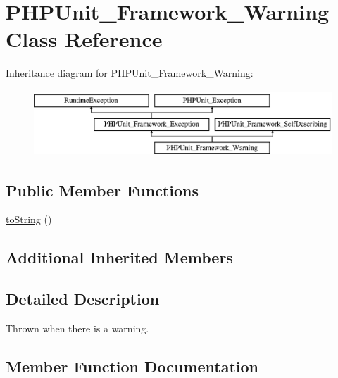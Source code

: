 \hypertarget{class_p_h_p_unit___framework___warning}{}\section{P\+H\+P\+Unit\+\_\+\+Framework\+\_\+\+Warning Class Reference}
\label{class_p_h_p_unit___framework___warning}
Inheritance diagram for P\+H\+P\+Unit\+\_\+\+Framework\+\_\+\+Warning\+:\begin{figure}[H]
\begin{center}
\leavevmode
\includegraphics[height=2.477876cm]{class_p_h_p_unit___framework___warning}
\end{center}
\end{figure}
\subsection*{Public Member Functions}
\begin{DoxyCompactItemize}
\item 
\mbox{\hyperlink{class_p_h_p_unit___framework___warning_a5558c5d549f41597377fa1ea8a1cefa3}{to\+String}} ()
\end{DoxyCompactItemize}
\subsection*{Additional Inherited Members}


\subsection{Detailed Description}
Thrown when there is a warning. 

\subsection{Member Function Documentation}
\mbox{\label{class_p_h_p_unit___framework___warning_a5558c5d549f41597377fa1ea8a1cefa3}} 

